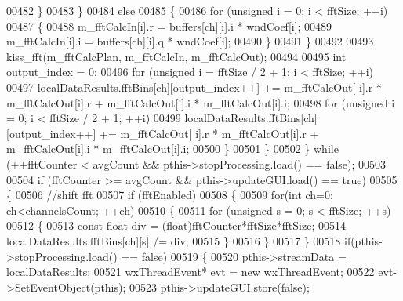 \begin{DoxyCode}
{{{00482                         \}
00483                     \}
00484                     \textcolor{keywordflow}{else}
00485                     \{
00486                         \textcolor{keywordflow}{for} (\textcolor{keywordtype}{unsigned} i = 0; i < fftSize; ++i)
00487                         \{
00488                             m\_fftCalcIn[i].r = buffers[ch][i].i * wndCoef[i];
00489                             m\_fftCalcIn[i].i = buffers[ch][i].q * wndCoef[i];
00490                         \}
00491                     \}
00492 
00493                     kiss_fft(m\_fftCalcPlan, m\_fftCalcIn, m\_fftCalcOut);
00494 
00495                     \textcolor{keywordtype}{int} output\_index = 0;
00496                     \textcolor{keywordflow}{for} (\textcolor{keywordtype}{unsigned} i = fftSize / 2 + 1; i < fftSize; ++i)
00497                         localDataResults.fftBins[ch][output\_index++] += m\_fftCalcOut[
      i].r * m\_fftCalcOut[i].r + m\_fftCalcOut[i].i * m\_fftCalcOut[i].i;
00498                     for (\textcolor{keywordtype}{unsigned} i = 0; i < fftSize / 2 + 1; ++i)
00499                         localDataResults.fftBins[ch][output\_index++] += m\_fftCalcOut[
      i].r * m\_fftCalcOut[i].r + m\_fftCalcOut[i].i * m\_fftCalcOut[i].i;
00500                 \}
00501             \}
00502         \} \textcolor{keywordflow}{while} (++fftCounter < avgCount && pthis->stopProcessing.load() == \textcolor{keyword}{false});
00503 
00504         \textcolor{keywordflow}{if} (fftCounter >= avgCount && pthis->updateGUI.load() == \textcolor{keyword}{true})
00505         \{
00506             \textcolor{comment}{//shift fft}
00507             \textcolor{keywordflow}{if} (fftEnabled)
00508             \{
00509                 \textcolor{keywordflow}{for}(\textcolor{keywordtype}{int} ch=0; ch<channelsCount; ++ch)
00510                 \{
00511                     \textcolor{keywordflow}{for} (\textcolor{keywordtype}{unsigned} s = 0; s < fftSize; ++s)
00512                     \{
00513                         \textcolor{keyword}{const} \textcolor{keywordtype}{float} div = (float)fftCounter*fftSize*fftSize;
00514                         localDataResults.fftBins[ch][s] /= div;
00515                     \}
00516                 \}
00517             \}
00518             \textcolor{keywordflow}{if}(pthis->stopProcessing.load() == \textcolor{keyword}{false})
00519             \{
00520                 pthis->streamData = localDataResults;
00521                 wxThreadEvent* evt = \textcolor{keyword}{new} wxThreadEvent;
00522                 evt->SetEventObject(pthis);
00523                 pthis->updateGUI.store(\textcolor{keyword}{false});
}}}
\end{DoxyCode}
